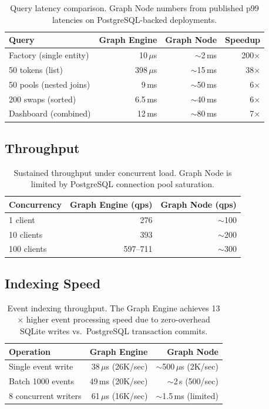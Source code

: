 \documentclass[11pt,a4paper]{article}
\begin{document}
\begin{table}[H]
\centering
\begin{tabular}{lrrr}
\toprule
\textbf{Query} & \textbf{Graph Engine} & \textbf{Graph Node} & \textbf{Speedup} \\
\midrule
Factory (single entity) & 10\,$\mu$s & $\sim$2\,ms & 200$\times$ \\
50 tokens (list) & 398\,$\mu$s & $\sim$15\,ms & 38$\times$ \\
50 pools (nested joins) & 9\,ms & $\sim$50\,ms & 6$\times$ \\
200 swaps (sorted) & 6.5\,ms & $\sim$40\,ms & 6$\times$ \\
Dashboard (combined) & 12\,ms & $\sim$80\,ms & 7$\times$ \\
\bottomrule
\end{tabular}
\caption{Query latency comparison. Graph Node numbers from published p99 latencies on
PostgreSQL-backed deployments.}
\end{table}

\subsection{Throughput}

\begin{table}[H]
\centering
\begin{tabular}{lrr}
\toprule
\textbf{Concurrency} & \textbf{Graph Engine (qps)} & \textbf{Graph Node (qps)} \\
\midrule
1 client & 276 & $\sim$100 \\
10 clients & 393 & $\sim$200 \\
100 clients & 597--711 & $\sim$300 \\
\bottomrule
\end{tabular}
\caption{Sustained throughput under concurrent load. Graph Node is limited by PostgreSQL
connection pool saturation.}
\end{table}

\subsection{Indexing Speed}

\begin{table}[H]
\centering
\begin{tabular}{lrr}
\toprule
\textbf{Operation} & \textbf{Graph Engine} & \textbf{Graph Node} \\
\midrule
Single event write & 38\,$\mu$s (26K/sec) & $\sim$500\,$\mu$s (2K/sec) \\
Batch 1000 events & 49\,ms (20K/sec) & $\sim$2\,s (500/sec) \\
8 concurrent writers & 61\,$\mu$s (16K/sec) & $\sim$1.5\,ms (limited) \\
\bottomrule
\end{tabular}
\caption{Event indexing throughput. The Graph Engine achieves 13$\times$ higher event
processing speed due to zero-overhead SQLite writes vs.\ PostgreSQL transaction commits.}
\end{table}
\end{document}
